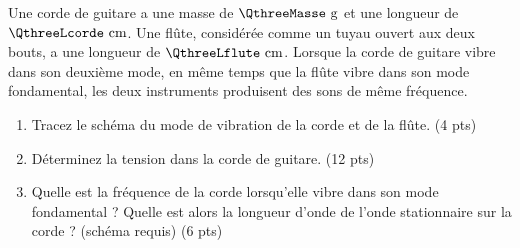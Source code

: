 
Une corde de guitare a une masse de $\QthreeMasse\text{ g}$ et une longueur de $\QthreeLcorde\text{ cm}$. Une flûte, considérée comme un tuyau ouvert aux deux bouts, a une longueur de $\QthreeLflute\text{ cm}$. Lorsque la corde de guitare vibre dans son deuxième mode, en même temps que la flûte vibre dans son mode fondamental, les deux instruments produisent des sons de même fréquence.

\begin{enumerate}[label=\alph*)]
    \item Tracez le schéma du mode de vibration de la corde et de la flûte. (4 pts)
    \item Déterminez la tension dans la corde de guitare. (12 pts)
    \item Quelle est la fréquence de la corde lorsqu'elle vibre dans son mode fondamental ? Quelle est alors la longueur d'onde de l'onde stationnaire sur la corde ? (schéma requis) (6 pts)
\end{enumerate}